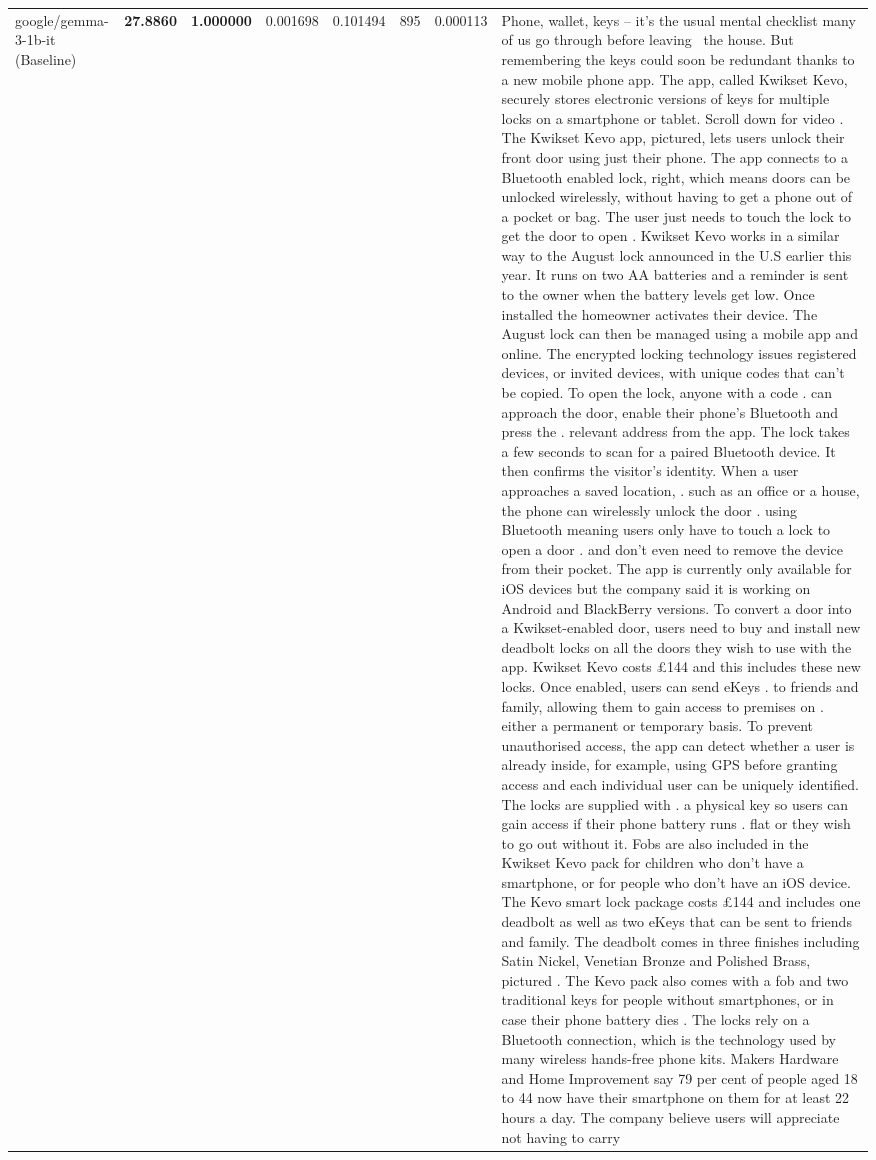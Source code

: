 \begin{table}[H]
\begin{tabular}{llrlllll}
google/gemma-3-1b-it (Baseline) & \bfseries 27.8860 & \bfseries 1.000000 & 0.001698 & 0.101494 & 895 & 0.000113 & Phone, wallet, keys – it’s the usual mental checklist many of us go through before leaving  the house. But remembering the keys could soon be redundant thanks to a new mobile phone app. The app, called Kwikset Kevo, securely stores electronic versions of keys for multiple locks on a smartphone or tablet. Scroll down for video . The Kwikset Kevo app, pictured, lets users unlock their front door using just their phone. The app connects to a Bluetooth enabled lock, right, which means doors can be unlocked wirelessly, without having to get a phone out of a pocket or bag. The user just needs to touch the lock to get the door to open . Kwikset Kevo works in a similar way to the August lock announced in the U.S earlier this year. It runs on two AA batteries and a reminder is sent to the owner when the battery levels get low. Once installed the homeowner activates their device. The August lock can then be managed using a mobile app and online. The encrypted locking technology issues registered devices, or invited devices, with unique codes that can't be copied. To open the lock, anyone with a code . can approach the door, enable their phone's Bluetooth and press the . relevant address from the app. The lock takes a few seconds to scan for a paired Bluetooth device. It then confirms the visitor's identity. When a user approaches a saved location, . such as an office or a house, the phone can wirelessly unlock the door . using Bluetooth meaning users only have to touch a lock to open a door . and don't even need to remove the device from their pocket. The app is currently only available for iOS devices but the company said it is working on Android and BlackBerry versions. To convert a door into a Kwikset-enabled door, users need to buy and install new deadbolt locks on all the doors they wish to use with the app. Kwikset Kevo costs £144 and this includes these new locks. Once enabled, users can send eKeys . to friends and family, allowing them to gain access to premises on . either a permanent or temporary basis. To prevent unauthorised access, the app can detect whether a user is already inside, for example, using GPS before granting access and each individual user can be uniquely identified. The locks are supplied with . a physical key so users can gain access if their phone battery runs . flat or they wish to go out without it. Fobs are also included in the Kwikset Kevo pack for children who don't have a smartphone, or for people who don't have an iOS device. The Kevo smart lock package costs £144 and includes one deadbolt as well as two eKeys that can be sent to friends and family. The deadbolt comes in three finishes including Satin Nickel, Venetian Bronze and Polished Brass, pictured . The Kevo pack also comes with a fob and two traditional keys for people without smartphones, or in case their phone battery dies . The locks rely on a Bluetooth connection, which is the technology used by many wireless hands-free phone kits. Makers Hardware and Home Improvement say 79 per cent of people aged 18 to 44 now have their smartphone on them for at least 22 hours a day. The company believe users will appreciate not having to carry 
\end{tabular}
\end{table}
